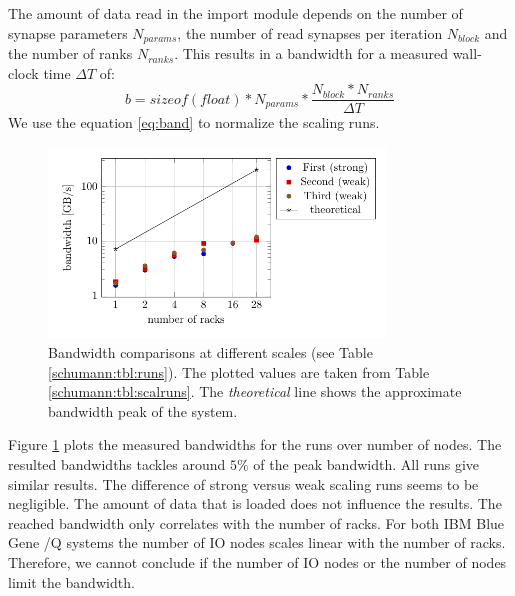 The amount of data read in the import module depends on the number of synapse parameters $N_{params}$,
the number of read synapses per iteration $N_{block}$ and the number of ranks $N_{ranks}$.
This results in a bandwidth for a measured wall-clock time $\Delta T$ of:
\begin{equation}
b = sizeof(float) * N_{params} * \frac{N_{block} * N_{ranks}}{\Delta T}
\label{eq:band}
\end{equation}
We use the equation \ref{eq:band} to normalize the scaling runs.
\begin{figure}[h!]
\begin{center}
 \includegraphics[width=0.8\textwidth]{pgfplots/bandwidth.pdf}
\end{center}
\caption[Bandwidth comparisons at different scales]{Bandwidth comparisons at different scales (see Table \ref{schumann:tbl:runs}).
The plotted values are taken from Table \ref{schumann:tbl:scalruns}.
The \emph{theoretical} line shows the approximate bandwidth peak of the system.}
\label{schumann:fig:bandwidth}
\end{figure}

Figure \ref{schumann:fig:bandwidth} plots the measured bandwidths for the runs over number of nodes.
The resulted bandwidths tackles around $5\%$ of the peak bandwidth.
All runs give similar results. The difference of strong versus weak scaling runs seems to be negligible.
The amount of data that is loaded does not influence the results.
The reached bandwidth only correlates with the number of racks.
For both IBM Blue Gene /Q systems the number of IO nodes scales linear with the number of racks.
Therefore, we cannot conclude if the number of IO nodes or the number of nodes limit the
bandwidth.

